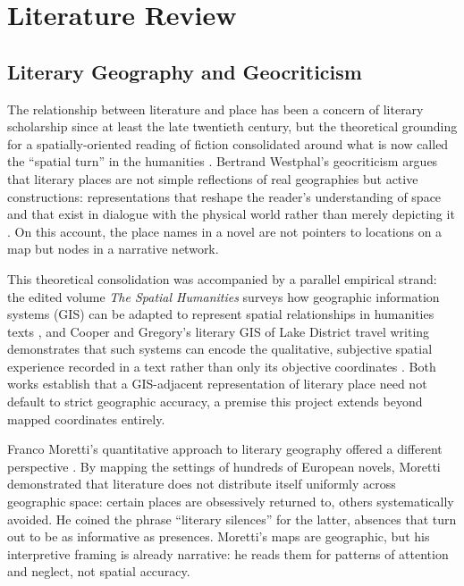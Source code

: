 \documentclass[logo,msc]{infthesis}
\begin{document}
 
\chapter{Literature Review}
\label{chap:lit}
 
\section{Literary Geography and Geocriticism}
 
The relationship between literature and place has been a concern of literary scholarship since at least the late twentieth century, but the theoretical grounding for a spatially-oriented reading of fiction consolidated around what is now called the ``spatial turn'' in the humanities \cite{tally2013}. Bertrand Westphal's geocriticism argues that literary places are not simple reflections of real geographies but active constructions: representations that reshape the reader's understanding of space and that exist in dialogue with the physical world rather than merely depicting it \cite{westphal2011}. On this account, the place names in a novel are not pointers to locations on a map but nodes in a narrative network.
 
This theoretical consolidation was accompanied by a parallel empirical strand: the edited volume \emph{The Spatial Humanities} surveys how geographic information systems (GIS) can be adapted to represent spatial relationships in humanities texts \cite{bodenhamer2010}, and Cooper and Gregory's literary GIS of Lake District travel writing demonstrates that such systems can encode the qualitative, subjective spatial experience recorded in a text rather than only its objective coordinates \cite{cooper2011}. Both works establish that a GIS-adjacent representation of literary place need not default to strict geographic accuracy, a premise this project extends beyond mapped coordinates entirely.

Franco Moretti's quantitative approach to literary geography offered a different perspective \cite{moretti2005}. By mapping the settings of hundreds of European novels, Moretti demonstrated that literature does not distribute itself uniformly across geographic space: certain places are obsessively returned to, others systematically avoided. He coined the phrase ``literary silences'' for the latter, absences that turn out to be as informative as presences. Moretti's maps are geographic, but his interpretive framing is already narrative: he reads them for patterns of attention and neglect, not spatial accuracy.
\end{document}
